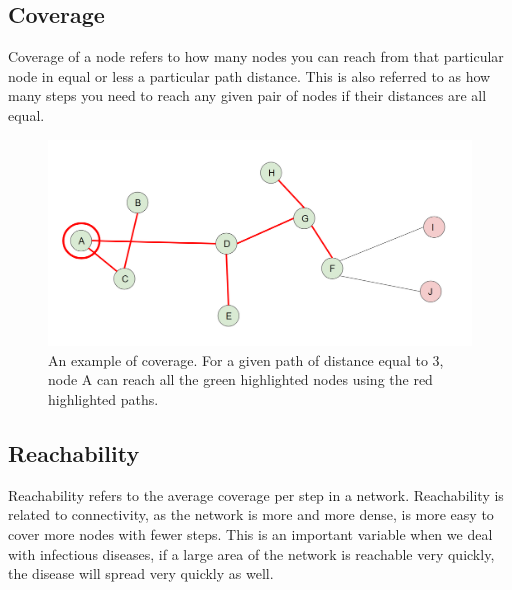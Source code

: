 \subsection{Coverage}

Coverage of a node refers to how many nodes you can reach from that particular node in equal or less a particular path distance. This is also referred to as how many steps you need to reach any given pair of nodes if their distances are all equal.

    \begin{figure}[h!]
        \centering
            \includegraphics[width=0.7\linewidth]{figures/Networks/Concepts/coverage.png} 
        \caption{An example of coverage. For a given path of distance equal to 3, node A can reach all the green highlighted nodes using the red highlighted paths.}
        \label{figure:networkCoverage}
    \end{figure}

\clearpage

\subsection{Reachability}

Reachability refers to the average coverage per step in a network. Reachability is related to connectivity, as the network is more and more dense, is more easy to cover more nodes with fewer steps. This is an important variable when we deal with infectious diseases, if a large area of the network is reachable very quickly, the disease will spread very quickly as well.

